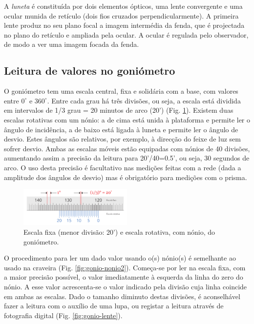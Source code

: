\documentclass[12pt,a4paper,oneside]{paper}
\begin{document}
A \emph{luneta} é constituída por dois elementos ópticos, uma lente convergente e uma ocular munida de retículo
(dois fios cruzados perpendicularmente). A primeira lente produz no seu plano focal a imagem intermédia da fenda,
que é projectada no plano do retículo e ampliada pela ocular. A ocular é regulada pelo observador, de modo a ver uma
imagem focada da fenda.

\subsection{\sf Leitura de valores no goniómetro}
O goniómetro tem uma escala central, fixa e solidária com a base, com valores entre $0^\circ$ e $360^\circ$. Entre cada
grau há três divisões, ou seja, a escala está dividida em intervalos de 1/3 grau = 20 minutos de arco (20')
(Fig. \ref{fig:gonio-nonio1}). Existem duas escalas rotativas com um nónio: a de cima está unida à plataforma e permite
ler o ângulo de incidência, a de baixo está ligada à luneta e permite ler o ângulo de desvio. Estes ângulos são relativos,
por exemplo, à direcção do feixe de luz sem sofrer desvio. Ambas as escalas móveis estão equipadas com nónios de 40 divisões,
aumentando assim a precisão da leitura para 20'/40=0.5', ou seja, 30 segundos de arco. O uso desta precisão é facultativo nas
medições feitas com a rede (dada a amplitude dos ângulos de desvio) mas é obrigatório para medições com o prisma.

\begin{figure}
	\centering 
	\includegraphics[width=0.5\textwidth]{./planck_images/gonio-nonio1}
	\caption{Escala fixa (menor divisão: 20') e escala rotativa, com nónio, do goniómetro.
	\label{fig:gonio-nonio1}} 
\end{figure}

O procedimento para ler um dado valor usando o(s) nónio(s) é semelhante ao usado na craveira (Fig. \ref{fig:gonio-nonio2}).
Começa-se por ler na escala fixa, com a maior precisão possível, o valor imediatamente à esquerda da linha do zero do nónio.
A esse valor acrescenta-se o valor indicado pela divisão cuja linha coincide em ambas as escalas. Dado o tamanho diminuto
destas divisões, é aconselhável fazer a leitura com o auxílio de uma lupa, ou registar a leitura através de fotografia digital
(Fig. \ref{fig:gonio-lente}).
\end{document}
